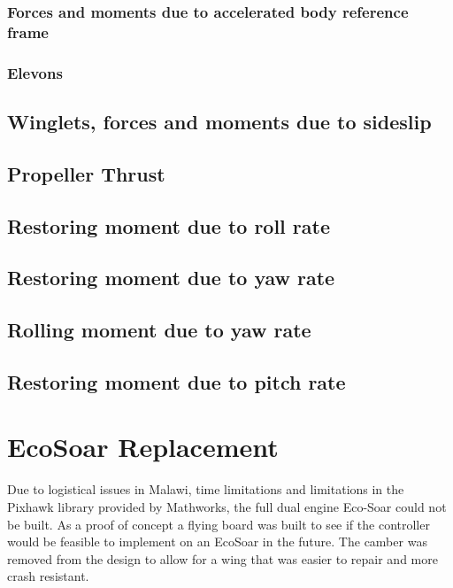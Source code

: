 \documentclass{article}
\begin{document}


\subsubsection{Forces and moments due to accelerated body reference frame}



\subsubsection{Elevons}


\subsection{Winglets, forces and moments due to sideslip}


\subsection{Propeller Thrust}


\subsection{Restoring moment due to roll rate}
\label{sec:restmomroll}


\subsection{Restoring moment due to yaw rate}


\subsection{Rolling moment due to yaw rate}


\subsection{Restoring moment due to pitch rate}









\section{EcoSoar Replacement}
Due to logistical issues in Malawi, time limitations and limitations in the Pixhawk library provided by Mathworks, the full dual engine Eco-Soar could not be built.
As a proof of concept a flying board was built to see if the controller would be feasible to implement on an EcoSoar in the future.
The camber was removed from the design to allow for a wing that was easier to repair and more crash resistant.
\end{document}
